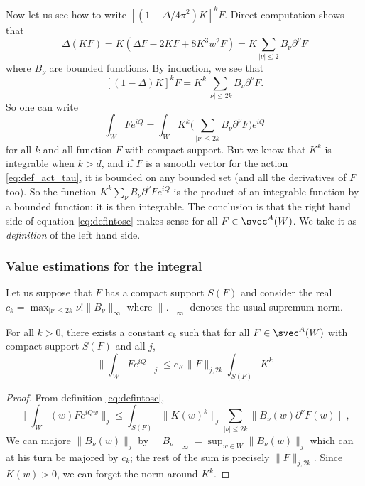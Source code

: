 Now let us see how to write $[(1-\Delta/4\pi^2)K]^kF$. Direct computation shows that
\[ 
  \Delta(KF)=K(\Delta F-2KF+8K^3w^2F)=K\sum_{| \nu |\leq 2}B_{\nu}\partial^{\nu}F
\]
where $B_{\nu}$ are bounded functions. By induction, we see that
\[ 
  [(1-\Delta )K]^kF=K^k\sum_{| \nu |\leq 2k}B_{\nu}\partial^{\nu}F.
\]
So one can write 
\begin{equation} \label{eq:defintosc}
\int_WFe^{iQ}=\int_WK^k\big( \sum_{| \nu |\leq 2k}B_{\nu}\partial^{\nu}F \big)e^{iQ}
\end{equation}
for all $k$ and all function $F$ with compact support. But we know that $K^k$ is integrable when $k>d$, and if $F$ is  a smooth vector for the action \eqref{eq:def_act_tau}, it is bounded on any bounded set (and all the derivatives of $F$ too). So the function $K^k\sum_{\nu}B_{\nu}\partial^{\nu}Fe^{iQ}$ is the product of an integrable function by a bounded function; it is then integrable. The conclusion is that the right hand side of equation \eqref{eq:defintosc} makes sense for all $F\in\svec^A(W)$. We take it as \emph{definition} of the left hand side.

\subsubsection{Value estimations for the integral}

Let us suppose that $F$ has a compact support $S(F)$ and consider the real $c_k=\max_{| \nu |\leq 2k}\nu!\| B_{\nu} \|_{\infty}$ where $\| . \|_{\infty}$ denotes the usual supremum norm.

\begin{lemma} \label{lem:born_osci_un}
For all $k>0$, there exists a constant $c_k$ such that for all $F\in\svec^A(W)$ with compact support $S(F)$ and all $j$,
\[ 
   \| \int_WFe^{iQ} \|_j\leq c_K\| F \|_{j,2k}\int_{S(F)}K^k
\]
\end{lemma}

\begin{proof}

From definition \eqref{eq:defintosc}, 
\begin{equation}
  \| \int_W(w)Fe^{iQw} \|_j \leq\int_{S(F)}\| K(w)^k \|_j\sum_{| \nu |\leq 2k} \|B_{\nu}(w)\partial^{\nu}F(w) \|,
\end{equation}
We can majore $\|B_{\nu}(w)\|_j$ by $\| B_{\nu} \|_{\infty}=\sup_{w\in W}\| B_{\nu}(w) \|_j$ which can at his turn be majored by $c_k$; the rest of the sum  is precisely $\| F \|_{j,2k}$. Since $K(w)>0$, we can forget the norm around $K^k$.

\end{proof}

